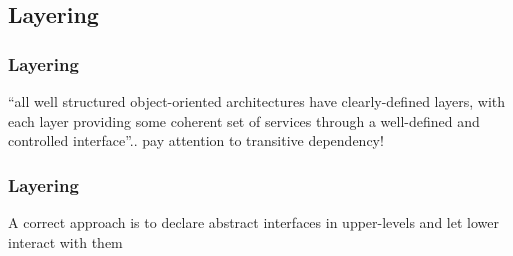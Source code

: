 \documentclass{beamer}
\begin{document}
\subsection{Layering}
\begin{frame}
	\frametitle{Layering}
	``all well structured object-oriented architectures have clearly-defined layers, with each layer providing some coherent set of services through a well-defined and controlled interface''.. pay attention to transitive dependency!
	\begin{center}
	\end{center}
\end{frame}

\begin{frame}
	\frametitle{Layering}
	A correct approach is to declare abstract interfaces in upper-levels and let lower interact with them
	\begin{center}
	\end{center}
\end{frame}
\end{document}
